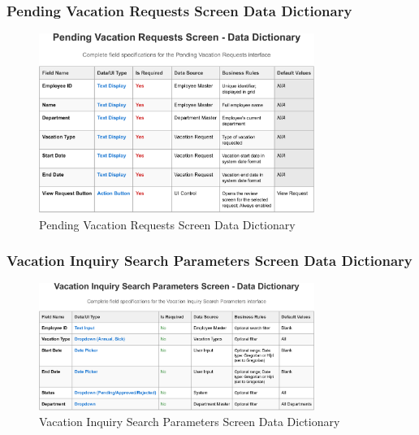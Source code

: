 \documentclass[12pt,a4paper]{article}
\begin{document}
\subsubsection{Pending Vacation Requests Screen Data Dictionary}
\begin{figure}[H]
\centering
\includegraphics[width=0.8\textwidth]{Data-Dictionary/Screen-Data-Dictionaries/Pending-Vacation-Requests-Screen-Data-Dictionary/Pending-Vacation-Requests-Screen-Data-Dictionary-1.png}
\caption{Pending Vacation Requests Screen Data Dictionary}
\label{fig:pending-vacation-requests-data-dict}
\end{figure}

\subsubsection{Vacation Inquiry Search Parameters Screen Data Dictionary}
\begin{figure}[H]
\centering
\includegraphics[width=0.8\textwidth]{Data-Dictionary/Screen-Data-Dictionaries/Vacation-Inquiry-Search-Parameters-Screen-Data-Dictionary/Vacation-Inquiry-Search-Parameters-Screen-Data-Dictionary-1.png}
\caption{Vacation Inquiry Search Parameters Screen Data Dictionary}
\label{fig:inquiry-search-params-data-dict}
\end{figure}
\end{document}

